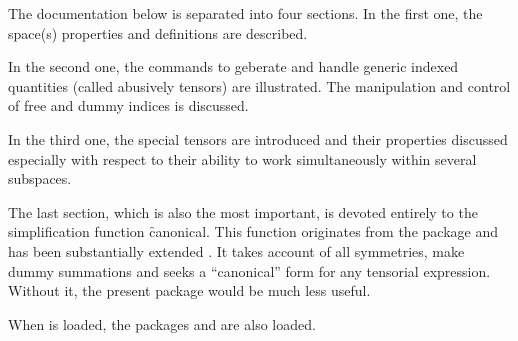 The documentation below is separated into four sections.
In the first one, the space(s) properties and definitions are described.

In the second one, the commands to geberate and  handle
generic indexed quantities (called abusively tensors) are illustrated.
The manipulation and control of free and dummy indices is discussed.

In the third one,  the special tensors are introduced and their properties
discussed especially with respect to their ability to work simultaneously within
several subspaces.

The last section, which is also the most important,  is devoted entirely to
the simplification function \f{canonical}. This function
originates from the package  and has been
substantially extended . It takes account of
all symmetries, make dummy summations and  seeks a ``canonical''
form for any tensorial expression.   Without it, the present
package would be much less useful.

\iffalse
Finally, an \textbf{index} has been created. It contains numerous references
to the text. Different typings have been adopted to make a clear
distinction between them. The conventions are the following:
\begin{itemize}
\item Procedure keywords are typed in capital  roman letters.
\item Package keywords are typed in typewriter capital letters.
\item Cantens package keywords are  in small typewriter letters.
\item All other keywords are typed in small roman letters.
\end{itemize}
\fi
When  is loaded,
the packages
 and  are also
loaded.

